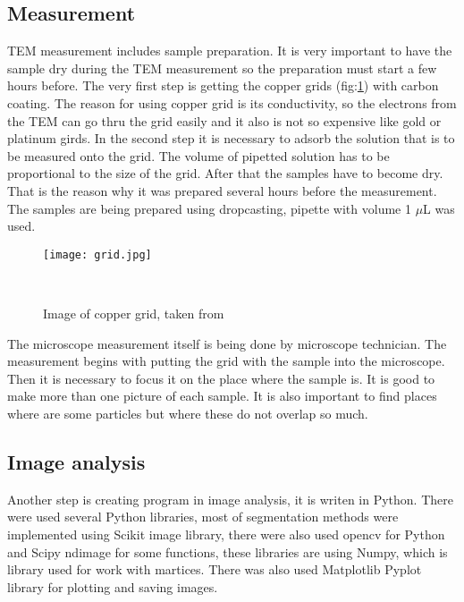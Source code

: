 \pagestyle{plain}

\subsection{Measurement}

TEM measurement includes sample preparation. It is very important to have
the sample dry during the TEM measurement so the preparation must start
a few hours before. The very first step is getting the copper grids (fig:\ref{fig:grid}) with carbon
coating. The reason for using copper grid is its conductivity, so the electrons
from the TEM can go thru the grid easily and it also is not so expensive like gold
or platinum girds. In the second step it is necessary to adsorb the solution that is
to be measured onto the grid. The volume of pipetted solution has to be proportional
to the size of the grid. After that the samples have to become dry.
That is the reason why it was prepared several hours before the measurement.
The samples are being prepared using dropcasting, pipette with volume 1 \(\mu\)L was used.

\begin{figure}[h]
\begin{center}
    \texttt{[image: grid.jpg]}
    \caption{Image of copper grid, taken from~\cite{grid}}~\label{fig:grid}
\end{center}
\end{figure}

The microscope measurement itself is being done by microscope technician.
The measurement begins with putting the grid with the sample into the microscope.
Then it is necessary to focus it on the place where the sample is. It is good to make
more than one picture of each sample. It is also important to find places where are
some particles but where these do not overlap so much.

\subsection{Image analysis}

Another step is creating program in image analysis, it is writen in Python.
There were used several Python libraries, most of segmentation methods were
implemented using Scikit image library, there were also used opencv for Python
and Scipy ndimage for some functions, these libraries are using Numpy, which
is library used for work with martices. There was also used Matplotlib Pyplot
library for plotting and saving images.


